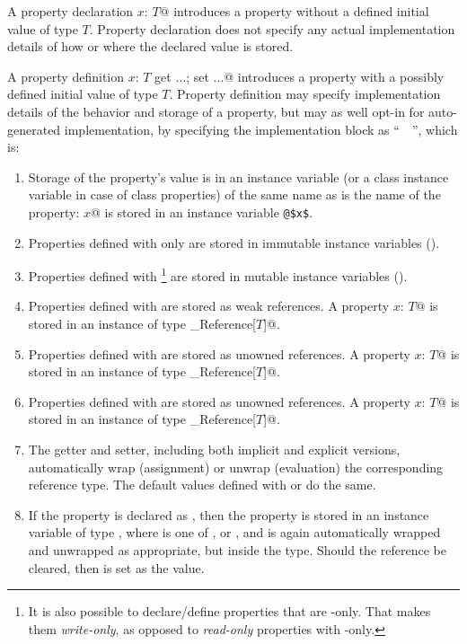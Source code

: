 A property declaration \lstinline@property $x$: $T$@ introduces a property without a defined initial value of type $T$. Property declaration does not specify any actual implementation details of how or where the declared value is stored.

A property definition \lstinline@property $x$: $T$ {get $\ldots$; set $\ldots$}@ introduces a property with a possibly defined initial value of type $T$. Property definition may specify implementation details of the behavior and storage of a property, but may as well opt-in for auto-generated implementation, by specifying the implementation block as ``~\code{_}~'', which is: 

\begin{enumerate}
\item 
Storage of the property's value is in an instance variable (or a class instance variable in case of class properties) of the same name as is the name of the property: \lstinline@property $x$@ is stored in an instance variable \lstinline+@$x$+. 

\item
Properties defined with only  are stored in immutable instance variables (). 

\item
Properties defined with \footnote{It is also possible to declare/define properties that are -only. That makes them {\em write-only}, as opposed to {\em read-only} properties with -only.} are stored in mutable instance variables (). 

\item
Properties defined with  are stored as weak references. A property \lstinline@property $x$: $T$@ is stored in an instance of type \lstinline@Weak_Reference[$T$]@. 

\item
Properties defined with  are stored as unowned references. A property \lstinline@property $x$: $T$@ is stored in an instance of type \lstinline@Unowned_Reference[$T$]@. 

\item
Properties defined with  are stored as unowned references. A property \lstinline@property $x$: $T$@ is stored in an instance of type \lstinline@Soft_Reference[$T$]@. 

\item
The getter and setter, including both implicit and explicit versions, automatically wrap (assignment) or unwrap (evaluation) the corresponding reference type. The default values defined with  or  do the same. 

\item
If the property is declared as , then the property is stored in an instance variable of type , where  is one of ,  or , and is again automatically wrapped and unwrapped as appropriate, but inside the  type. Should the reference be cleared, then  is set as the value. 

\end{enumerate}

